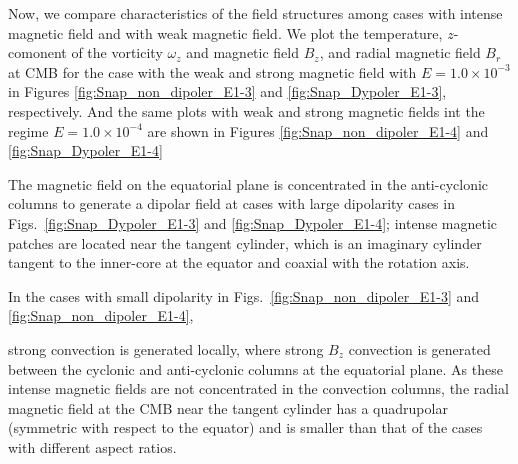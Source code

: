 {\color{blue}
Now, we compare characteristics of the field structures among cases with intense magnetic field and with weak magnetic field. We plot the temperature, $z$-comonent of the vorticity $\omega_{z}$ and magnetic field $B_{z}$, and radial magnetic field $B_{r}$ at CMB for the case with the weak and strong magnetic field with $E = 1.0 \times 10^{-3}$ in Figures \ref{fig:Snap_non_dipoler_E1-3} and \ref{fig:Snap_Dypoler_E1-3}, respectively. And the same plots with weak and strong magnetic fields int the regime $E = 1.0 \times 10^{-4}$ are shown in Figures \ref{fig:Snap_non_dipoler_E1-4} and \ref{fig:Snap_Dypoler_E1-4}
}
{\color{blue}
The magnetic field on the equatorial plane is concentrated in the anti-cyclonic columns to generate a dipolar field at cases with large dipolarity cases in Figs.~\ref{fig:Snap_Dypoler_E1-3} and \ref{fig:Snap_Dypoler_E1-4}; intense magnetic patches are located near the tangent cylinder, which is an imaginary cylinder tangent to the inner-core at the equator and coaxial with the rotation axis. 

In the cases with small dipolarity in Figs.~\ref{fig:Snap_non_dipoler_E1-3} and \ref{fig:Snap_non_dipoler_E1-4},
}
strong convection is generated locally, where strong $B_{z}$ convection is generated between the cyclonic and anti-cyclonic columns at the equatorial plane.
As these intense magnetic fields are not concentrated in the convection columns, the radial magnetic field at the CMB near the tangent cylinder has a quadrupolar (symmetric with respect to the equator) and is smaller than that of the cases with different aspect ratios.

